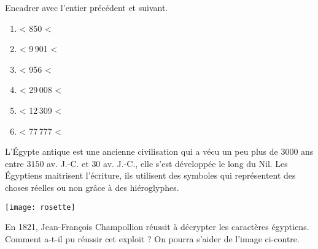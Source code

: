 \begin{colonne*exercice}
\bigskip

\begin{exercice}
   Encadrer avec l'entier précédent et suivant. \medskip
   \begin{enumerate}
      \item \pfh < 850 < \pfh\mbox{} \medskip
      \item \pfh < 9\,901 < \pfh\mbox{} \medskip
      \item \pfh < 956 < \pfh\mbox{} \medskip
      \item \pfh < 29\,008 < \pfh\mbox{} \medskip
      \item \pfh < 12\,309 < \pfh\mbox{} \medskip
      \item \pfh < 77\,777 < \pfh\mbox{}
   \end{enumerate}
\end{exercice}

\end{colonne*exercice}


\Recreation

   \partie[introduction]
      L'Égypte antique est une ancienne civilisation qui a vécu un peu plus de $3000$ ans entre $3150$ av. J.-C. et $30$ av. J.-C., elle s'est développée le long du Nil. Les Égyptiens maitrisent l'écriture, ils utilisent des symboles qui représentent des choses réelles ou non grâce à des hiéroglyphes. \\ [3mm]
      \begin{minipage}{6.5cm}
         \texttt{[image: rosette]}
      \end{minipage}
      \qquad
      \begin{minipage}{9.5cm}
         En 1821, Jean-François Champollion réussit à décrypter les caractères égyptiens. Comment a-t-il pu réussir cet exploit ? On pourra s'aider de l'image ci-contre. \\ [3mm]
         \pf \\ [3mm]
         \pf \\ [3mm]
         \pf
      \end{minipage}

      \bigskip
      
